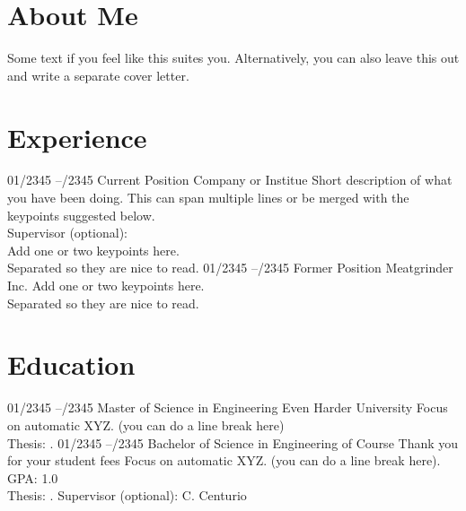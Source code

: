 \documentclass[letterpaper,11pt]{dolce-cv} %
\begin{document}
	\section{About Me}
	Some text if you feel like this suites you. Alternatively, you can also leave this out and write a separate cover letter.
	
	\vspace*{\baselineskip}
	\section{Experience}
	\begin{entrylist}
		\entry
		{01/2345 --/2345}
		{Current Position}
		{Company or Institue}
		{Short description of what you have been doing. This can span multiple lines or be merged with the keypoints suggested below.\\
		Supervisor (optional): \\
		Add one or two keypoints here.\\
		Separated so they are nice to read.}
		\entry
		{01/2345 --/2345}
		{Former Position}
		{Meatgrinder Inc.}
		{Add one or two keypoints here.\\
		Separated so they are nice to read.}
	\end{entrylist}
	
	\section{Education}
	\begin{entrylist}
		\entry
		{01/2345 --/2345}
		{Master of Science {\normalfont in Engineering Even Harder}}
		{University}
		{Focus on automatic XYZ. (you can do a line break here)\\
		Thesis: \papertitle{Title}{}.
		}
		\entry
		{01/2345 --/2345}
		{Bachelor of Science {\normalfont in Engineering of Course}}
		{Thank you for your student fees}
		{Focus on automatic XYZ. (you can do a line break here). GPA: 1.0\\
	     Thesis: \papertitle{De Bello Gallico}{}.
	     Supervisor (optional): C. Centurio
        }
	\end{entrylist}
\end{document}
